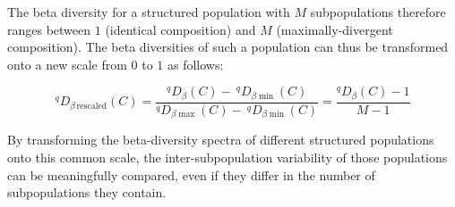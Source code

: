 \noindent The beta diversity for a structured population with $M$ subpopulations therefore ranges between $1$ (identical composition) and $M$ (maximally-divergent composition). The beta diversities of such a population can thus be transformed onto a new scale from $0$ to $1$ as follows:

\begin{equation}
^qD_{\beta\,\mathrm{rescaled}}(C) = \frac{^qD_\beta(C) -\:^qD_{\beta\min}(C)}{^qD_{\beta\max}(C) -\: ^qD_{\beta\min}(C)} = \frac{^qD_\beta(C) - 1}{M - 1}
\label{eq:diversity_beta_rescale}
\end{equation}

\noindent By transforming the beta-diversity spectra of different structured populations onto this common scale, the inter-subpopulation variability of those populations can be meaningfully compared, even if they differ in the number of subpopulations they contain.